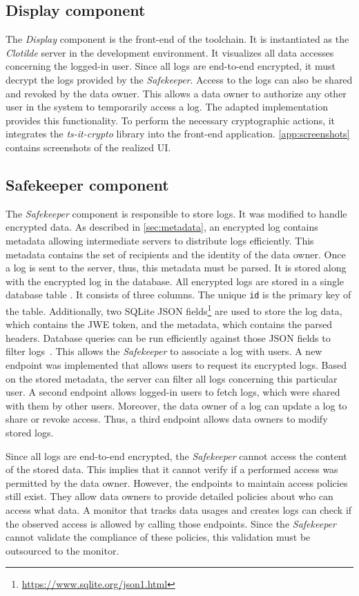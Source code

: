 \documentclass[../main.tex]{subfiles}
\begin{document}
\subsection{Display component}
The \emph{Display} component is the front-end of the toolchain.
It is instantiated as the \emph{Clotilde} server in the development environment.
It visualizes all data accesses concerning the logged-in user.
Since all logs are end-to-end encrypted, it must decrypt the logs provided by the \emph{Safekeeper}.
Access to the logs can also be shared and revoked by the data owner.
This allows a data owner to authorize any other user in the system to temporarily access a log.
The adapted implementation provides this functionality.
To perform the necessary cryptographic actions, it integrates the \emph{ts-it-crypto} library into the front-end application.
\cref{app:screenshots} contains screenshots of the realized UI.

\subsection{Safekeeper component}
\label{sec:implemenation-safekeeper}
The \emph{Safekeeper} component is responsible to store logs.
It was modified to handle encrypted data.
As described in \cref{sec:metadata}, an encrypted log contains metadata allowing intermediate servers to distribute logs efficiently.
This metadata contains the set of recipients and the identity of the data owner.
Once a log is sent to the server, thus, this metadata must be parsed.
It is stored along with the encrypted log in the database.
All encrypted logs are stored in a single database table . 
It consists of three columns.
The unique \verb|id| is the primary key of the table.
Additionally, two SQLite JSON fields\footnote{\url{https://www.sqlite.org/json1.html}} are used to store the log data, which contains the JWE token, and the metadata, which contains the parsed headers.
Database queries can be run efficiently against those JSON fields to filter logs~\cite{Shang2021}.
This allows the \emph{Safekeeper} to associate a log with users.
A new endpoint was implemented that allows users to request its encrypted logs.
Based on the stored metadata, the server can filter all logs concerning this particular user.
A second endpoint allows logged-in users to fetch logs, which were shared with them by other users.
Moreover, the data owner of a log can update a log to share or revoke access.
Thus, a third endpoint allows data owners to modify stored logs.

Since all logs are end-to-end encrypted, the \emph{Safekeeper} cannot access the content of the stored data.
This implies that it cannot verify if a performed access was permitted by the data owner.
However, the endpoints to maintain access policies still exist.
They allow data owners to provide detailed policies about who can access what data.
A monitor that tracks data usages and creates logs can check if the observed access is allowed by calling those endpoints.
Since the \emph{Safekeeper} cannot validate the compliance of these policies, this validation must be outsourced to the monitor.
\end{document}
